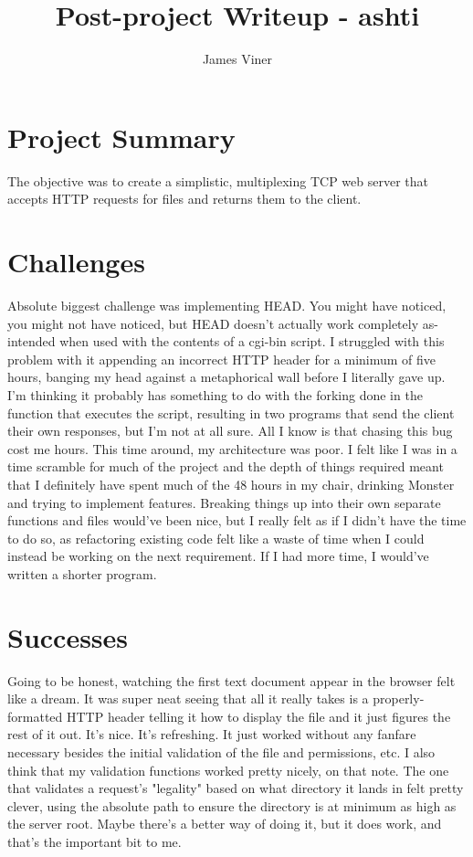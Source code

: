 \documentclass[11pt]{report}
\begin{document}
\title{Post-project Writeup - ashti}
\author{James Viner}
\date{} %

\maketitle

\doublespacing

\section*{Project Summary}
The objective was to create a simplistic, multiplexing TCP web server that accepts HTTP requests for files and returns them to the client.
\section*{Challenges}
Absolute biggest challenge was implementing HEAD. You might have noticed, you might not have noticed, but HEAD doesn't actually work completely as-intended when used with the contents of a cgi-bin script. I struggled with this problem with it appending an incorrect HTTP header for a minimum of five hours, banging my head against a metaphorical wall before I literally gave up. I'm thinking it probably has something to do with the forking done in the function that executes the script, resulting in two programs that send the client their own responses, but I'm not at all sure. All I know is that chasing this bug cost me hours.
This time around, my architecture was poor. I felt like I was in a time scramble for much of the project and the depth of things required meant that I definitely have spent much of the 48 hours in my chair, drinking Monster and trying to implement features. Breaking things up into their own separate functions and files would've been nice, but I really felt as if I didn't have the time to do so, as refactoring existing code felt like a waste of time when I could instead be working on the next requirement. If I had more time, I would've written a shorter program.
\section*{Successes}
Going to be honest, watching the first text document appear in the browser felt like a dream. It was super neat seeing that all it really takes is a properly-formatted HTTP header telling it how to display the file and it just figures the rest of it out. It's nice. It's refreshing. It just worked without any fanfare necessary besides the initial validation of the file and permissions, etc. I also think that my validation functions worked pretty nicely, on that note. The one that validates a request's "legality" based on what directory it lands in felt pretty clever, using the absolute path to ensure the directory is at minimum as high as the server root. Maybe there's a better way of doing it, but it does work, and that's the important bit to me.
\end{document}
